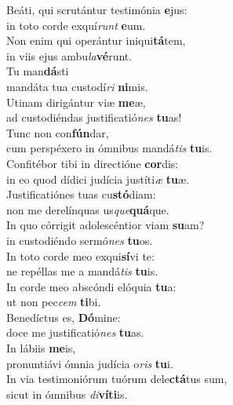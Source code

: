 \evenverse Beáti, qui scrutántur testimónia \textbf{e}jus:~\*\\
\evenverse in toto corde exquí\textit{runt} \textbf{e}um.\\
\oddverse Non enim qui operántur iniqui\textbf{tá}tem,~\*\\
\oddverse in viis ejus ambu\textit{la}\textbf{vé}runt.\\
\evenverse Tu man\textbf{dá}sti~\*\\
\evenverse mandáta tua custodí\textit{ri} \textbf{ni}mis.\\
\oddverse Utinam dirigántur viæ \textbf{me}æ,~\*\\
\oddverse ad custodiéndas justificatió\textit{nes} \textbf{tu}as!\\
\evenverse Tunc non con\textbf{fún}dar,~\*\\
\evenverse cum perspéxero in ómnibus mandá\textit{tis} \textbf{tu}is.\\
\oddverse Confitébor tibi in directióne \textbf{cor}dis:~\*\\
\oddverse in eo quod dídici judícia justíti\textit{æ} \textbf{tu}æ.\\
\evenverse Justificatiónes tuas cu\textbf{stó}diam:~\*\\
\evenverse non me derelínquas us\textit{que}\textbf{quá}que.\\
\oddverse In quo córrigit adolescéntior viam \textbf{su}am?~\*\\
\oddverse in custodiéndo sermó\textit{nes} \textbf{tu}os.\\
\evenverse In toto corde meo exqui\textbf{sí}vi te:~\*\\
\evenverse ne repéllas me a mandá\textit{tis} \textbf{tu}is.\\
\oddverse In corde meo abscóndi elóquia \textbf{tu}a:~\*\\
\oddverse ut non pec\textit{cem} \textbf{ti}bi.\\
\evenverse Benedíctus es, \textbf{Dó}mine:~\*\\
\evenverse doce me justificatió\textit{nes} \textbf{tu}as.\\
\oddverse In lábiis \textbf{me}is,~\*\\
\oddverse pronuntiávi ómnia judícia o\textit{ris} \textbf{tu}i.\\
\evenverse In via testimoniórum tuórum dele\textbf{ctá}tus sum,~\*\\
\evenverse sicut in ómnibus \textit{di}\textbf{ví}\textbf{ti}is.\\
